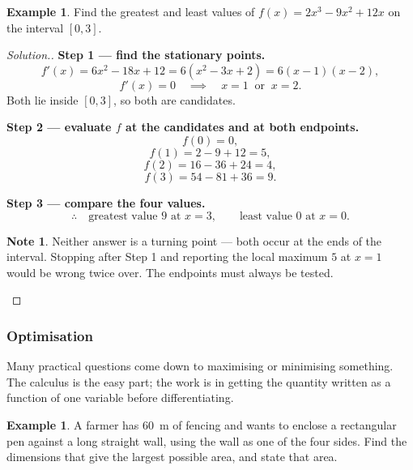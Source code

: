 \documentclass[11pt,a4paper]{article}
\theoremstyle{definition}
\newtheorem{example}[thm]{Example}
\newtheorem{note}[thm]{Note}
\newenvironment{solution}
  {\renewcommand{\qedsymbol}{}\begin{proof}[\textit{Solution}.]}
  {\end{proof}}
\begin{document}
\begin{example}
Find the greatest and least values of $f(x)=2x^3-9x^2+12x$ on the interval $[0,3]$.
\end{example}

\begin{solution}
\textbf{Step 1 --- find the stationary points.}
$$f'(x)=6x^2-18x+12=6\left(x^2-3x+2\right)=6(x-1)(x-2),$$
$$f'(x)=0\quad\implies\quad x=1\ \text{ or }\ x=2.$$
Both lie inside $[0,3]$, so both are candidates.

\textbf{Step 2 --- evaluate $f$ at the candidates and at both endpoints.}
$$f(0)=0,$$
$$f(1)=2-9+12=5,$$
$$f(2)=16-36+24=4,$$
$$f(3)=54-81+36=9.$$

\textbf{Step 3 --- compare the four values.}
$$\therefore\quad \text{greatest value } 9 \text{ at } x=3,\qquad
\text{least value } 0 \text{ at } x=0.$$

\begin{note}
Neither answer is a turning point --- both occur at the ends of the interval. Stopping
after Step 1 and reporting the local maximum $5$ at $x=1$ would be wrong twice over. The
endpoints must always be tested.
\end{note}
\end{solution}

\subsubsection{Optimisation}

Many practical questions come down to maximising or minimising something. The
calculus is the easy part; the work is in getting the quantity written as a function of
one variable before differentiating.

\begin{example}
A farmer has $60$~m of fencing and wants to enclose a rectangular pen against a long
straight wall, using the wall as one of the four sides. Find the dimensions that give
the largest possible area, and state that area.
\end{example}
\end{document}
